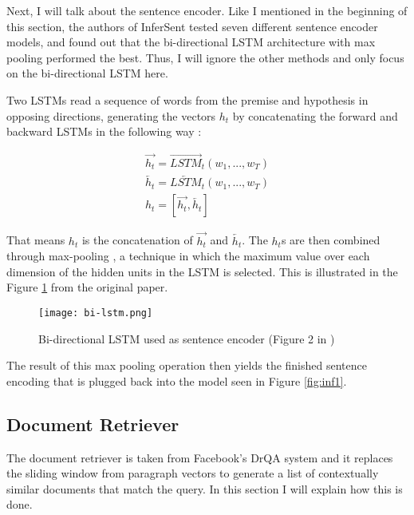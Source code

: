 Next, I will talk about the sentence encoder. Like I mentioned in the beginning of this section, the authors of InferSent tested
seven different sentence encoder models, and found out that the bi-directional LSTM architecture with max pooling performed
the best. Thus, I will ignore the other methods and only focus on the bi-directional LSTM here.

Two LSTMs read a sequence of words from the premise and hypothesis in opposing directions, generating the vectors $h_t$ by
concatenating the forward and backward LSTMs in the following way \citep{infersent}:

\begin{gather}
\overrightarrow{h_t} = \overrightarrow{LSTM}_t(w_1,...,w_T) \\
\overleftarrow{h_t} = \overleftarrow{LSTM}_t(w_1,...,w_T) \\
h_t = [\overrightarrow{h_t}, \overleftarrow{h_t}]
\end{gather}

That means $h_t$ is the concatenation of $\overrightarrow{h_t}$ and $\overleftarrow{h_t}$. The $h_t$s are then combined through
max-pooling \citep{max-pooling}, a technique in which the maximum value over each dimension of the hidden units in the LSTM is
selected. This is illustrated in the Figure \ref{fig:inf3} from the original paper.

\begin{figure}
  \begin{center}
    \texttt{[image: bi-lstm.png]}
  \end{center}
  \captionsetup{width=.75\linewidth}
  \caption{Bi-directional LSTM used as sentence encoder (Figure 2 in \citet{infersent})}
  \label{fig:inf3}
\end{figure}

The result of this max pooling operation then yields the finished sentence encoding that is plugged back into the model seen in
Figure \ref{fig:inf1}.


\subsection{Document Retriever}
\label{theory:docret}

The document retriever is taken from Facebook's DrQA system \citep{drqa} and it replaces the sliding
window from paragraph vectors \citep{doc2vec} to generate a list of contextually similar documents that match the query. In
this section I will explain how this is done.

